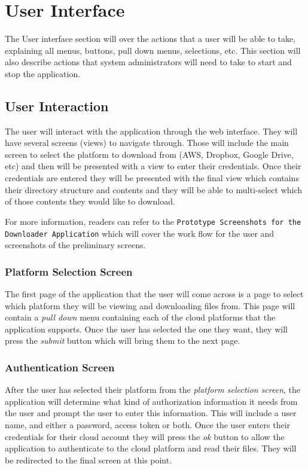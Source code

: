 \documentclass{article}
\begin{document}
\section{User Interface}
The User interface section will over the actions that a user will be able to take, explaining all menus, buttons,
pull down menus, selections, etc. This section will also describe actions that system administrators will need to
take to start and stop the application.

    \subsection{User Interaction}
    The user will interact with the application through the web interface. They will have several screens (views)
    to navigate through. Those will include the main screen to select the platform to download from (AWS, Dropbox,
    Google Drive, etc) and then will be presented with a view to enter their credentials. Once their credentials
    are entered they will be presented with the final view which contains their directory structure and contents
    and they will be able to multi-select which of those contents they would like to download.

    For more information, readers can refer to the \texttt{Prototype Screenshots for the Downloader Application}\cite{prot}
    which will cover the work flow for the user and screenshots of the preliminary screens.
    
      \subsubsection{Platform Selection Screen}
      The first page of the application that the user will come across is a page to select which platform they will be
      viewing and downloading files from. This page will contain a \textit{pull down} menu containing each of the
      cloud platforms that the application supports. Once the user has selected the one they want, they will press the
      \textit{submit} button which will bring them to the next page.

      \subsubsection{Authentication Screen}
      After the user has selected their platform from the \textit{platform selection screen}, the application will
      determine what kind of authorization information it needs from the user and prompt the user to enter this information.
      This will include a user name, and either a password, access token or both. Once the user enters their credentials for
      their cloud account they will press the \textit{ok} button to allow the application to authenticate to the cloud platform
      and read their files. They will be redirected to the final screen at this point.
    
\end{document}
